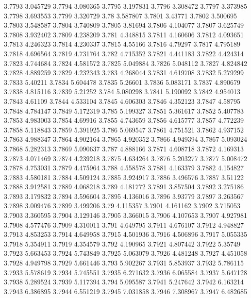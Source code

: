 3.7793  3.045729
3.7794  3.080365
3.7795  3.197831
3.7796  3.308472
3.7797  3.373985
3.7798  3.693553
3.7799  3.320729
3.78  3.587807
3.7801  3.43771
3.7802  3.500695
3.7803  3.548587
3.7804  3.740809
3.7805  3.81694
3.7806  4.104077
3.7807  3.625749
3.7808  3.932402
3.7809  4.238209
3.781  4.348815
3.7811  4.160606
3.7812  4.093651
3.7813  4.246323
3.7814  4.230337
3.7815  4.55166
3.7816  4.79297
3.7817  4.795189
3.7818  4.696564
3.7819  4.731764
3.782  4.715352
3.7821  4.441183
3.7822  4.424314
3.7823  4.744684
3.7824  4.581572
3.7825  5.049884
3.7826  5.048112
3.7827  4.824842
3.7828  4.889259
3.7829  4.232343
3.783  4.268044
3.7831  4.619708
3.7832  5.279299
3.7833  5.40211
3.7834  5.604478
3.7835  5.26601
3.7836  5.083171
3.7837  4.890679
3.7838  4.815116
3.7839  5.21252
3.784  5.080298
3.7841  5.190092
3.7842  4.954013
3.7843  4.61109
3.7844  4.533104
3.7845  4.606303
3.7846  4.352123
3.7847  4.58795
3.7848  4.784147
3.7849  5.172319
3.785  5.199327
3.7851  5.361617
3.7852  5.407783
3.7853  4.983003
3.7854  4.69916
3.7855  4.743659
3.7856  4.615777
3.7857  4.772239
3.7858  5.118843
3.7859  5.391925
3.786  5.069547
3.7861  4.751521
3.7862  4.937152
3.7863  4.988347
3.7864  4.902164
3.7865  4.920352
3.7866  4.949394
3.7867  5.093024
3.7868  5.282313
3.7869  5.090637
3.787  4.888166
3.7871  4.608718
3.7872  4.169313
3.7873  4.071469
3.7874  4.239218
3.7875  4.634264
3.7876  5.203277
3.7877  5.008472
3.7878  4.753031
3.7879  4.475964
3.788  4.558578
3.7881  4.163379
3.7882  4.154827
3.7883  4.580181
3.7884  4.509124
3.7885  3.924917
3.7886  3.496576
3.7887  3.51122
3.7888  3.912581
3.7889  4.068218
3.789  4.181772
3.7891  3.857504
3.7892  3.275186
3.7893  3.179832
3.7894  3.596604
3.7895  4.136016
3.7896  3.93779
3.7897  3.263567
3.7898  3.009476
3.7899  3.499206
3.79  4.115357
3.7901  4.161162
3.7902  3.715053
3.7903  3.360595
3.7904  3.129146
3.7905  3.366015
3.7906  4.107653
3.7907  4.927981
3.7908  4.577476
3.7909  4.310011
3.791  4.649795
3.7911  4.676107
3.7912  4.948827
3.7913  4.853253
3.7914  4.649958
3.7915  4.501936
3.7916  4.506896
3.7917  5.055335
3.7918  5.354911
3.7919  4.354579
3.792  4.190965
3.7921  4.807442
3.7922  5.35749
3.7923  5.663453
3.7924  5.743849
3.7925  5.063079
3.7926  4.481248
3.7927  4.451058
3.7928  4.949798
3.7929  5.661446
3.793  5.902267
3.7931  5.853937
3.7932  5.786115
3.7933  5.578619
3.7934  5.745551
3.7935  6.271632
3.7936  6.065584
3.7937  5.647128
3.7938  5.289524
3.7939  5.117394
3.794  5.095587
3.7941  5.247642
3.7942  6.163214
3.7943  6.386895
3.7944  6.551219
3.7945  7.031858
3.7946  7.308967
3.7947  6.482685
